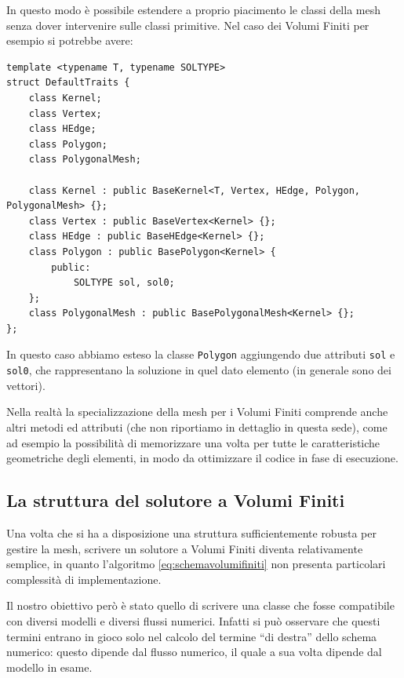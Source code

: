 In questo modo è possibile estendere a proprio piacimento le classi della mesh senza dover intervenire sulle classi primitive. Nel caso dei Volumi Finiti per esempio si potrebbe avere:
\begin{lstlisting}
template <typename T, typename SOLTYPE>
struct DefaultTraits {
    class Kernel;
    class Vertex;
    class HEdge;
    class Polygon;
    class PolygonalMesh;

    class Kernel : public BaseKernel<T, Vertex, HEdge, Polygon, PolygonalMesh> {};
    class Vertex : public BaseVertex<Kernel> {};
    class HEdge : public BaseHEdge<Kernel> {};
    class Polygon : public BasePolygon<Kernel> {
        public:
            SOLTYPE sol, sol0;
    };
    class PolygonalMesh : public BasePolygonalMesh<Kernel> {};
};
\end{lstlisting}
In questo caso abbiamo esteso la classe \texttt{Polygon} aggiungendo due attributi \texttt{sol} e \texttt{sol0}, che rappresentano la soluzione in quel dato elemento (in generale sono dei vettori).

Nella realtà la specializzazione della mesh per i Volumi Finiti comprende anche altri metodi ed attributi (che non riportiamo in dettaglio in questa sede), come ad esempio la possibilità di memorizzare una volta per tutte le caratteristiche geometriche degli elementi, in modo da ottimizzare il codice in fase di esecuzione.

\subsection{La struttura del solutore a Volumi Finiti}
Una volta che si ha a disposizione una struttura sufficientemente robusta per gestire la mesh, scrivere un solutore a Volumi Finiti diventa relativamente semplice, in quanto l'algoritmo \eqref{eq:schemavolumifiniti} non presenta particolari complessità di implementazione.

Il nostro obiettivo però è stato quello di scrivere una classe che fosse compatibile con diversi modelli e diversi flussi numerici. Infatti si può osservare che questi termini entrano in gioco solo nel calcolo del termine ``di destra'' dello schema numerico: questo dipende dal flusso numerico, il quale a sua volta dipende dal modello in esame.

